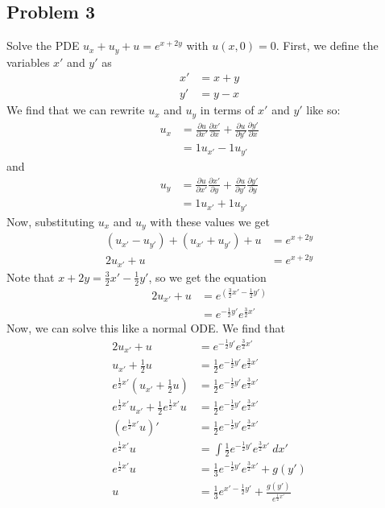 \documentclass{ben}
\begin{document}
\subsection{Problem 3}
\noindent
Solve the PDE $u_x + u_y + u = e^{x + 2y}$ with $u(x, 0) = 0$.
First, we define the variables $x'$ and $y'$ as
\begin{align*}
    x' &= x + y\\
    y' &= y - x
\end{align*}
We find that we can rewrite $u_x$ and $u_y$ in terms of $x'$ and $y'$ like so:
\begin{align*}
    u_x &= \frac{\partial u}{\partial x'} \frac{\partial x'}{\partial x} + \frac{\partial u}{\partial y'} \frac{\partial y'}{\partial x}\\
    &= 1 u_{x'} - 1 u_{y'}
\end{align*}
and
\begin{align*}
    u_y &= \frac{\partial u}{\partial x'} \frac{\partial x'}{\partial y} + \frac{\partial u}{\partial y'} \frac{\partial y'}{\partial y}\\
    &= 1 u_{x'} + 1 u_{y'}
\end{align*}
Now, substituting $u_x$ and $u_y$ with these values we get
\begin{align*}
    \left( u_{x'} - u_{y'} \right) + \left( u_{x'} + u_{y'} \right) + u &= e^{x + 2y}\\
    2 u_{x'} + u &= e^{x + 2y}
\end{align*}
Note that $x + 2y = \frac{3}{2}x' - \frac{1}{2}y'$, so we get the equation
\begin{align*}
    2 u_{x'} + u &= e^{\left(\frac{3}{2}x' - \frac{1}{2}y'\right)}\\
    &= e^{-\frac{1}{2}y'}e^{\frac{3}{2}x'}
\end{align*}
Now, we can solve this like a normal ODE. We find that
\begin{align*}
    2u_{x'} + u &= e^{-\frac{1}{2}y'}e^{\frac{3}{2}x'}\\
    u_{x'} + \frac{1}{2}u &= \frac{1}{2} e^{-\frac{1}{2}y'}e^{\frac{3}{2}x'}\\
    e^{\frac{1}{2}x'}\left(u_{x'} + \frac{1}{2}u\right)
    &= \frac{1}{2}e^{-\frac{1}{2}y'}e^{\frac{3}{2}x'}\\
    e^{\frac{1}{2}x'} u_{x'} + \frac{1}{2} e^{\frac{1}{2}x'} u
    &= \frac{1}{2}e^{-\frac{1}{2}y'}e^{\frac{3}{2}x'}\\
    \left( e^{\frac{1}{2}x'} u \right)'
    &= \frac{1}{2}e^{-\frac{1}{2}y'}e^{\frac{3}{2}x'}\\
    e^{\frac{1}{2}x'} u
    &= \int \frac{1}{2}e^{-\frac{1}{2}y'}e^{\frac{3}{2}x'}\ dx'\\
    e^{\frac{1}{2}x'} u
    &= \frac{1}{3}e^{-\frac{1}{2}y'} e^{\frac{3}{2}x'} + g(y')\\
    u &= \frac{1}{3} e^{x' - \frac{1}{2}y'} + \frac{g(y')}{e^{\frac{1}{2}x'}}
\end{align*}
\end{document}
